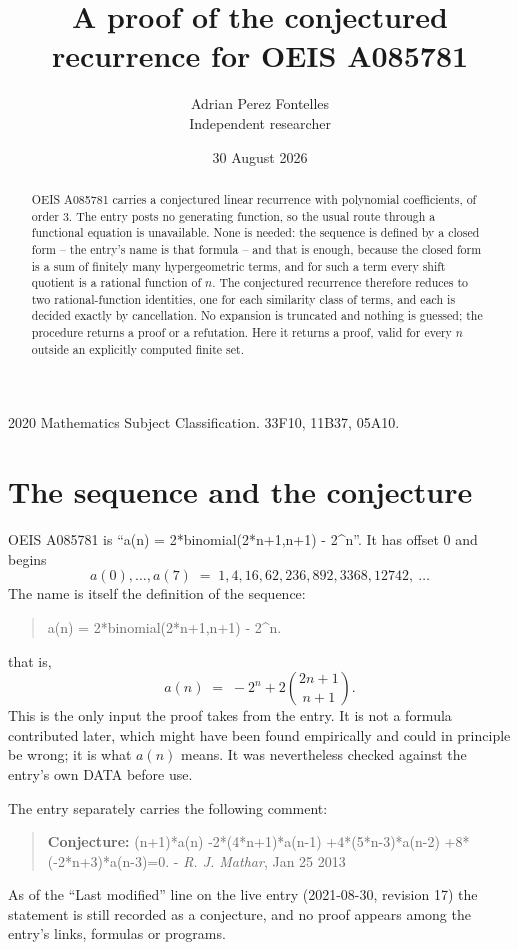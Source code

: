 \documentclass[11pt,a4paper]{article}
\title{A proof of the conjectured recurrence for OEIS A085781}
\author{Adrian Perez Fontelles\\ \small Independent researcher}
\date{30 August 2026}
\theoremstyle{plain}
\theoremstyle{definition}
\begin{document}
\maketitle

\begin{abstract}
OEIS A085781 carries a conjectured linear recurrence with polynomial coefficients, of
order 3. The entry posts no generating function, so the usual route through a
functional equation is unavailable. None is needed: the sequence is defined by a closed
form -- the entry's name is that formula -- and that is enough, because the closed form is a sum of finitely many hypergeometric terms, and for such a
term every shift quotient is a rational function of $n$. The conjectured recurrence
therefore reduces to two rational-function identities, one for each similarity
class of terms, and each is decided exactly by cancellation. No expansion is truncated and
nothing is guessed; the procedure returns a proof or a refutation. Here it returns a proof,
valid for every $n$ outside an explicitly computed finite set.
\end{abstract}

\noindent\small 2020 Mathematics Subject Classification. 33F10, 11B37, 05A10.\normalsize

\section{The sequence and the conjecture}

OEIS A085781 is ``a(n) = 2*binomial(2*n+1,n+1) - 2\textasciicircum{}n''. It has offset $0$ and begins
\[
a(0),\dots,a(7)\;=\;1, 4, 16, 62, 236, 892, 3368, 12742,\ \dots
\]
The name is itself the definition of the sequence:
\begin{quote}\small
a(n) = 2*binomial(2*n+1,n+1) - 2\textasciicircum{}n.
\end{quote}
that is,
\begin{equation}\label{eq:cf}
a(n)\;=\;- 2^{n} + 2 {\binom{2 n + 1}{n + 1}} .
\end{equation}
This is the only input the proof takes from the entry. It is not a formula contributed
later, which might have been found empirically and could in principle be wrong; it is what
$a(n)$ means. It was nevertheless checked against the entry's own DATA before use.

The entry separately carries the following comment:
\begin{quote}\small
\textbf{Conjecture:} (n+1)*a(n) -2*(4*n+1)*a(n-1) +4*(5*n-3)*a(n-2) +8*(-2*n+3)*a(n-3)=0. - \emph{R. J. Mathar}, Jan 25 2013
\end{quote}
As of the ``Last modified'' line on the live entry (2021-08-30, revision 17) the
statement is still recorded as a conjecture, and no proof appears among the entry's links,
formulas or programs.
\end{document}
